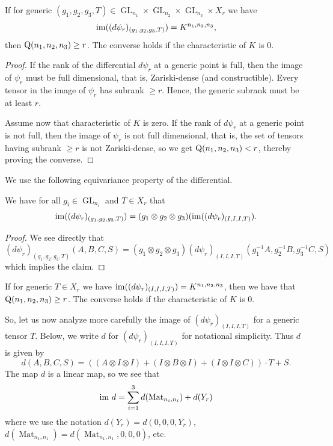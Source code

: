 \documentclass[11pt]{article}
\theoremstyle{definition}
\theoremstyle{remark}
\newcommand{\gensubrank}{{\rm Q}}
\newcommand{\GL}{\operatorname{GL}}
\newcommand{\Mat}{\operatorname{Mat}}
\newcommand{\im}{{\rm im}}
\begin{document}
%
\begin{lemma}
If for generic $(g_1,g_2,g_3,T) \in \GL_{n_1} \times \GL_{n_2} \times \GL_{n_3} \times X_r$ we have
\[
\im((d\psi_r)_{(g_1,g_2,g_3,T)}) = K^{n_1,n_2,n_3},
\]
then $\gensubrank(n_1,n_2,n_3) \geq r$. The converse holds if the characteristic of $K$ is $0$.
\end{lemma}

\begin{proof}
If the rank of the differential $d\psi_r$ at a generic point is full, then the image of $\psi_r$ must be full dimensional, that is, Zariski-dense (and constructible). Every tensor in the image of $\psi_r$ has subrank $\geq r$. Hence, the generic subrank must be at least $r$.

Assume now that characteristic of $K$ is zero. If the rank of $d \psi_r$ at a generic point is not full, then the image of $\psi_r$ is not full dimensional, that is, the set of tensors having subrank $\geq r$ is not Zariski-dense, so we get $\gensubrank(n_1,n_2,n_3) < r$, thereby proving the converse.
\end{proof}

%
%
We use the following equivariance property of the differential.

\begin{lemma}
We have for all $g_i \in \GL_{n_i}$ and $T \in X_r$ that
\[
\im( (d\psi_r)_{(g_1,g_2,g_3,T)}) = (g_1 \otimes g_2 \otimes g_3) (\im( (d\psi_r)_{(I,I,I,T)}).
\]
\end{lemma}

\begin{proof}
We see directly that
\[
(d\psi_r)_{(g_1,g_2,g_3,T)} (A,B,C,S) =  (g_1 \otimes g_2 \otimes g_3) (d\psi_r)_{(I,I,I,T)} (g_1^{-1} A, g_2^{-1}B, g_3^{-1}C, S)
\]
which implies the claim.
\end{proof}

%
\begin{corollary} \label{cor:im-d-subrank}
If for generic $T \in X_r$ we have $
\im( (d\psi_r)_{(I,I,I,T)}) = K^{n_1,n_2,n_3}$, then we have that $\gensubrank(n_1,n_2,n_3) \geq r$. The converse holds if the characteristic of $K$ is $0$.
\end{corollary}


So, let us now analyze more carefully the image of $(d\psi_r)_{(I,I,I,T)}$ for a generic tensor $T$. Below, we write $d$ for $(d\psi_r)_{(I,I,I,T)}$ for notational simplicity.
Thus $d$ is given by
\[
d(A,B,C,S) = ((A \otimes I \otimes I) + (I \otimes B \otimes I) + (I \otimes I \otimes C)) \cdot T + S.
\]
The map $d$ is a linear map, so we see that
\[
\im\  d = \sum_{i=1}^3 d(\Mat_{n_i,n_i}) + d(Y_r)
\]
where we use the notation $d(Y_r) = d(0,0,0,Y_r)$,  $d(\Mat_{n_1, n_1}) = d(\Mat_{n_1, n_1}, 0,0,0)$, etc.
\end{document}
